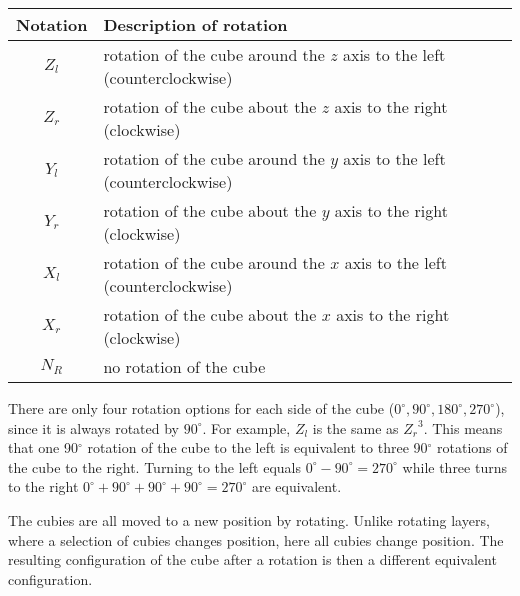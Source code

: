 \vspace*{1em}
\begin{adjustbox}{width=1\textwidth,center}
\begin{tabular}{cl}
\toprule
\textbf{Notation} & \textbf{Description of rotation} \\
\midrule
$Z_l$ & rotation of the cube around the $z$ axis to the left (counterclockwise)\\

$Z_r$ & rotation of the cube about the $z$ axis to the right (clockwise) \\

$Y_l$ & rotation of the cube around the $y$ axis to the left (counterclockwise)\\

$Y_r$ & rotation of the cube about the $y$ axis to the right (clockwise) \\

$X_l$ & rotation of the cube around the $x$ axis to the left (counterclockwise)\\

$X_r$ & rotation of the cube about the $x$ axis to the right (clockwise) \\

$N_R$ & no rotation of the cube \\
\bottomrule
\end{tabular}
\end{adjustbox}

\vspace{0.5cm}
 There are only four rotation options for each side of the cube ($0^\circ, 90^\circ, 180^\circ, 270^\circ$), since it is always rotated by $90^\circ$. For example, $Z_l$ is the same as ${Z_r}^3$. This means that one 90$^\circ$ rotation of the cube to the left is equivalent to three 90$^\circ$ rotations of the cube to the right. Turning to the left equals $0^\circ-90^\circ = 270^\circ$ while three turns to the right $0^\circ+90^\circ+90^\circ+90^\circ=270^\circ$ are equivalent.

The cubies are all moved to a new position by rotating. Unlike rotating layers, where a selection of cubies changes position, here all cubies change position. The resulting configuration of the cube after a rotation is then a different equivalent configuration.

